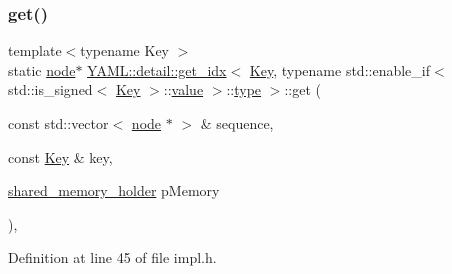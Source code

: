 \subsubsection{\texorpdfstring{get()}{get()}\hspace{0.1cm}{\footnotesize\ttfamily [1/2]}}
{\footnotesize\ttfamily template$<$typename Key $>$ \\
static \mbox{\hyperlink{class_y_a_m_l_1_1detail_1_1node}{node}}$\ast$ \mbox{\hyperlink{struct_y_a_m_l_1_1detail_1_1get__idx}{Y\+A\+M\+L\+::detail\+::get\+\_\+idx}}$<$ \mbox{\hyperlink{namespace_y_a_m_l_a67c320aa50d3de7ecba1d0b8775dd684a1af533fc24b0311b8c4d5ac2870283aa}{Key}}, typename std\+::enable\+\_\+if$<$ std\+::is\+\_\+signed$<$ \mbox{\hyperlink{namespace_y_a_m_l_a67c320aa50d3de7ecba1d0b8775dd684a1af533fc24b0311b8c4d5ac2870283aa}{Key}} $>$\+::\mbox{\hyperlink{glad_8h_a03aff08f73d7fde3d1a08e0abd8e84fa}{value}} $>$\+::\mbox{\hyperlink{glad_8h_a890efa53b3d7deeeced6f3a0d6653ed3}{type}} $>$\+::get (\begin{DoxyParamCaption}\item[{const std\+::vector$<$ \mbox{\hyperlink{class_y_a_m_l_1_1detail_1_1node}{node}} $\ast$ $>$ \&}]{sequence,  }\item[{const \mbox{\hyperlink{namespace_y_a_m_l_a67c320aa50d3de7ecba1d0b8775dd684a1af533fc24b0311b8c4d5ac2870283aa}{Key}} \&}]{key,  }\item[{\mbox{\hyperlink{namespace_y_a_m_l_1_1detail_a228c4b3b6ba1058b474d40afc218e21d}{shared\+\_\+memory\+\_\+holder}}}]{p\+Memory }\end{DoxyParamCaption})\hspace{0.3cm}{\ttfamily [inline]}, {\ttfamily [static]}}



Definition at line 45 of file impl.\+h.

\mbox{\label{struct_y_a_m_l_1_1detail_1_1get__idx_3_01_key_00_01typename_01std_1_1enable__if_3_01std_1_1is__s88702b83581fef4d38e6abb882a529e6_abdf891be70afa075240fc1d07d317d1b}} 
